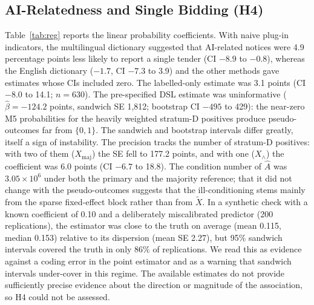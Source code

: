 \documentclass[runningheads]{llncs}
\begin{document}
\subsection{AI-Relatedness and Single Bidding (H4)}
\label{sec:reg}
Table~\ref{tab:reg} reports the linear probability coefficients. With naive plug-in indicators, the multilingual dictionary suggested that AI-related notices were 4.9 percentage points less likely to report a single tender (CI $-8.9$ to $-0.8$), whereas the English dictionary ($-1.7$, CI $-7.3$ to 3.9) and the other methods gave estimates whose CIs included zero. The labelled-only estimate was 3.1 points (CI $-8.0$ to 14.1; $n=630$). The pre-specified DSL estimate was uninformative ($\hat\beta=-124.2$ points, sandwich SE 1,812; bootstrap CI $-495$ to 429): the near-zero M5 probabilities for the heavily weighted stratum-D positives produce pseudo-outcomes far from $\{0,1\}$. The sandwich and bootstrap intervals differ greatly, itself a sign of instability. The precision tracks the number of stratum-D positives: with two of them ($X_{\mathrm{maj}}$) the SE fell to 177.2 points, and with one ($X_\wedge$) the coefficient was 6.0 points (CI $-6.7$ to 18.8). The condition number of $\hat{A}$ was $3.05\times10^{6}$ under both the primary and the majority reference; that it did not change with the pseudo-outcomes suggests that the ill-conditioning stems mainly from the sparse fixed-effect block rather than from $\tilde{X}$. In a synthetic check with a known coefficient of 0.10 and a deliberately miscalibrated predictor (200 replications), the estimator was close to the truth on average (mean 0.115, median 0.153) relative to its dispersion (mean SE 2.27), but 95\% sandwich intervals covered the truth in only 86\% of replications. We read this as evidence against a coding error in the point estimator and as a warning that sandwich intervals under-cover in this regime. The available estimates do not provide sufficiently precise evidence about the direction or magnitude of the association, so H4 could not be assessed.
\end{document}
